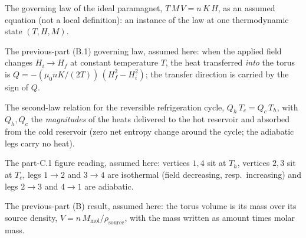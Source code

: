 \begin{definition}
\label{def:IPhO2026Problems_problem_IPhO_2026_3_C_3:EquationOfStateParamagnet}
The governing law of the ideal paramagnet, $T\,M\,V = n\,K\,H$, as an
assumed equation (not a local definition): an instance of the law at one
thermodynamic state $(T, H, M)$.
\end{definition}

\begin{definition}
\label{def:IPhO2026Problems_problem_IPhO_2026_3_C_3:IsothermalHeatIntoTorus}
The previous-part (B.1) governing law, assumed here: when the applied field
changes $H_i \to H_f$ at constant temperature $T$, the heat transferred
\emph{into} the torus is $Q = -(\mu_0 n K / (2 T))\,(H_f^2 - H_i^2)$; the
transfer direction is carried by the sign of $Q$.
\end{definition}

\begin{definition}
\label{def:IPhO2026Problems_problem_IPhO_2026_3_C_3:CarnotHeatRatio}
The second-law relation for the reversible refrigeration cycle,
$Q_h\,T_c = Q_c\,T_h$, with $Q_h, Q_c$ the \emph{magnitudes} of the heats
delivered to the hot reservoir and absorbed from the cold reservoir (zero
net entropy change around the cycle; the adiabatic legs carry no heat).
\end{definition}

\begin{definition}
\label{def:IPhO2026Problems_problem_IPhO_2026_3_C_3:Figure3bAssignment}
The part-C.1 figure reading, assumed here: vertices $1,4$ sit at $T_h$,
vertices $2,3$ sit at $T_c$, legs $1{\to}2$ and $3{\to}4$ are isothermal
(field decreasing, resp.\ increasing) and legs $2{\to}3$ and $4{\to}1$ are
adiabatic.
\end{definition}

\begin{definition}
\label{def:IPhO2026Problems_problem_IPhO_2026_3_C_3:TorusVolumeFromSource}
The previous-part (B) result, assumed here: the torus volume is its mass
over its source density, $V = n\,M_{\mathrm{mol}} / \rho_{\mathrm{source}}$,
with the mass written as amount times molar mass.
\end{definition}

